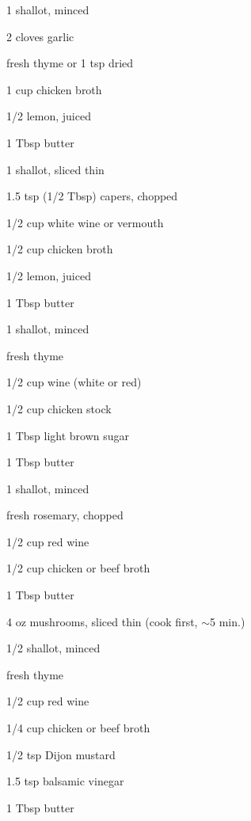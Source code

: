 \documentclass[oneside]{book}  %
\newcommand{\itemNL}{\item[] \hspace{-\labelsep}}  %
\newcommand{\about}{$\sim$}
\begin{document}
\begin{twocols}
  \begin{ingredients}[title=Garlic Lemon Thyme]
    \item[1] shallot, minced
    \item[2] cloves garlic
    \itemNL fresh thyme or 1 tsp dried
    \item[1 cup] chicken broth
    \item[1/2] lemon, juiced
    \item[1 Tbsp] butter
  \end{ingredients}

  \begin{ingredients}[title=Lemon Caper White Wine]
    \item[1] shallot, sliced thin
    \item[1.5 tsp (1/2 Tbsp)] capers, chopped
    \item[1/2 cup] white wine or vermouth
    \item[1/2 cup] chicken broth
    \item[1/2] lemon, juiced
    \item[1 Tbsp] butter
  \end{ingredients}

  \begin{ingredients}[title=Thyme Wine]
    \item[1] shallot, minced
    \itemNL fresh thyme
    \item[1/2 cup] wine (white or red)
    \item[1/2 cup] chicken stock
    \item[1 Tbsp] light brown sugar
    \item[1 Tbsp] butter
  \end{ingredients}

  \columnbreak

  \begin{ingredients}[title=Red Wine Rosemary]
    \item[1] shallot, minced
    \itemNL fresh rosemary, chopped
    \item[1/2 cup] red wine
    \item[1/2 cup] chicken or beef broth
    \item[1 Tbsp] butter
  \end{ingredients}

  \begin{ingredients}[title=Red Wine Mushroom Thyme]
    \item[4 oz] mushrooms, sliced thin (cook first, \about 5 min.)
    \item[1/2] shallot, minced
    \itemNL fresh thyme
    \item[1/2 cup] red wine
    \item[1/4 cup] chicken or beef broth
    \item[1/2 tsp] Dijon mustard
    \item[1.5 tsp] balsamic vinegar
    \item[1 Tbsp] butter
  \end{ingredients}


\end{twocols}
\end{document}
